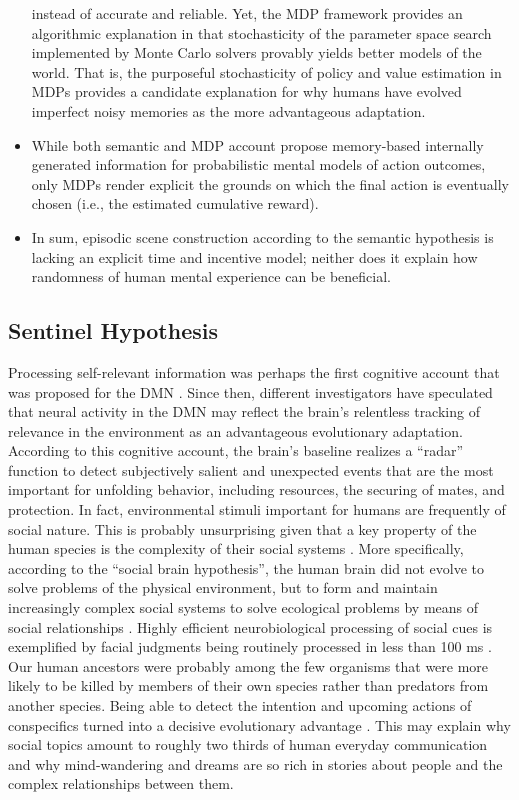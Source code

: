 \documentclass{article} %
\begin{document}
\begin{itemize}
  instead of accurate and reliable.
  Yet, the MDP framework provides an algorithmic explanation in that
  stochasticity of the parameter space search implemented
  by Monte Carlo solvers provably yields better models of the world.
  That is, the purposeful stochasticity of policy and value estimation
  in MDPs provides a candidate explanation for why humans
  have evolved imperfect noisy memories
  as the more advantageous adaptation.
  \item While both semantic and MDP account propose memory-based internally
  generated information for probabilistic mental models of action outcomes,
  only MDPs render explicit the grounds on which the final action is
  eventually chosen (i.e., the estimated cumulative reward).
  \item In sum, episodic scene construction according to the semantic
  hypothesis is lacking an explicit time and incentive model;
  neither does it explain how randomness of human mental experience
  can be beneficial.
\end{itemize}



\subsection{Sentinel Hypothesis}
Processing self-relevant information was perhaps the first
cognitive account that was proposed for the DMN \citep{gusnard2001medial}.
Since then,
different investigators have speculated that neural activity in the DMN
may reflect the brain’s relentless tracking of
relevance in the environment
as an advantageous evolutionary adaptation.
According to this cognitive account, the brain's baseline realizes
a ``radar'' function to
detect subjectively salient and unexpected events that
are the most important for unfolding behavior,
including resources,
the securing of mates, and protection.
%
In fact,
environmental stimuli important for humans are frequently of
social nature. This is probably unsurprising
given that a key property of the human species is
the complexity of their social systems
\citep{tomasello2009cultural}.
More specifically,
according to the ``social brain hypothesis'',
the human brain did not evolve to solve problems of the
physical environment, but to form and maintain increasingly complex
social systems to solve ecological problems by means of social relationships
\citep{whiten1988machiavellian}.
Highly efficient neurobiological processing of social cues is exemplified by
facial judgments being routinely processed in less than 100 ms
\citep{bar2006very}.
Our human ancestors were probably among the few organisms that
were more likely to be killed by members of their own species
rather than predators from another species.
Being able to detect the intention and upcoming actions of conspecifics
turned into a decisive evolutionary advantage
\citep{frith2010social}.
%
This may explain why social topics amount to roughly
two thirds of human everyday communication \citep{dunbar1997human}
and
why mind-wandering and dreams
are so rich in stories about people and the complex relationships between them.
\end{document}
